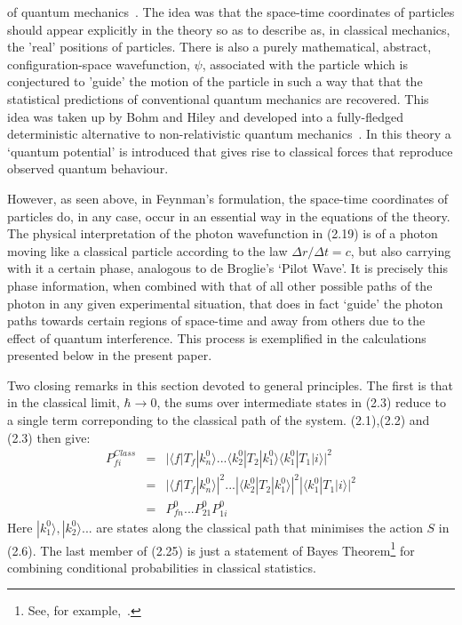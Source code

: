 {  of quantum mechanics~\cite{DeBroglie2}. The idea was that the space-time coordinates of
   particles should appear explicitly in the theory so as to describe as, in classical 
   mechanics, the 'real' positions of particles. There is also a purely mathematical, 
   abstract, configuration-space wavefunction, $\psi$, associated with the particle which is
  conjectured to 'guide' the motion of the particle in such a way that that the statistical
  predictions of conventional quantum mechanics are recovered. This idea was taken up by
  Bohm and Hiley and developed into a fully-fledged deterministic alternative to
  non-relativistic quantum mechanics~\cite{BH}. In this theory a `quantum potential'
  is introduced that gives rise to classical forces that reproduce observed quantum
  behaviour.
  \par However, as seen above, in Feynman's formulation, the space-time
  coordinates of particles do, in any case, occur in an essential way in the 
  equations of the theory. The physical interpretation of the photon wavefunction
  in (2.19) is of a photon moving like a classical particle according to the law
  $\Delta r/\Delta t = c$, but also carrying with it a certain phase, analogous to
 de Broglie's `Pilot Wave'. It is precisely this phase information, when
  combined with that of all other possible paths of the photon in any given 
  experimental situation, that does in fact `guide' the photon paths towards certain 
  regions of space-time and away from others due to the effect of quantum
  interference. This process is exemplified in the calculations presented
  below in the present paper.
  \par Two closing remarks in this section devoted to general principles.
   The first is that in the classical limit, $\hbar \rightarrow 0$, the sums over intermediate
  states in (2.3) reduce to a single term correponding to the classical path of the system.
  (2.1),(2.2) and (2.3) then give:
   \begin{eqnarray}
    P_{fi}^{Class} & = & |\langle f|T_f|k_n^0 \rangle ...\langle k_2^0|T_2|k_1^0 \rangle
                   \langle k_1^0|T_1|i \rangle|^2  \nonumber \\
                   & = & |\langle f|T_f|k_n^0 \rangle|^2...|\langle k_2^0|T_2|k_1^0 \rangle|^2
                         |\langle k_1^0|T_1|i \rangle|^2  \nonumber \\
                   & = & P^0_{fn}... P^0_{21} P^0_{1i}                     
  \end{eqnarray} 
   Here $|k_1^0 \rangle, |k_2^0\rangle ...$ are states along the classical path that minimises the action $S$ in
   (2.6). The last member of (2.25) is just a statement of Bayes Theorem\footnote{See, for example,~\cite{Bayes}.}
    for combining conditional
  probabilities in classical statistics.

}
